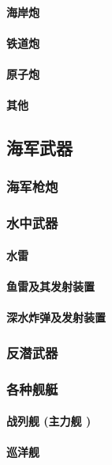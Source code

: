 \documentclass[UTF8]{../ApplicationUniverse}
\begin{document}
            \paragraph{海岸炮}
            \paragraph{铁道炮}
            \paragraph{原子炮}
            \paragraph{其他}
    \subsection{海军武器}
        \subsubsection{海军枪炮}
        \subsubsection{水中武器}
            \paragraph{水雷}
            \paragraph{鱼雷及其发射装置}
            \paragraph{深水炸弹及发射装置}
        \subsubsection{反潜武器}
        \subsubsection{各种舰艇}
            \paragraph{战列舰 (主力舰 )}
            \paragraph{巡洋舰}
\end{document}
